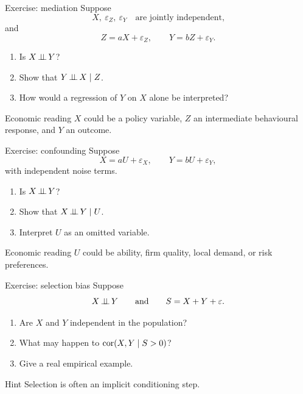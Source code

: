 \documentclass[dvipsnames,aspectratio=169,handout]{beamer}
\begin{document}
\begin{frame}{Exercise: mediation}
Suppose
\[
X,\ \varepsilon_Z,\ \varepsilon_Y
\quad\text{are jointly independent,}
\]
and
\[
Z=aX+\varepsilon_Z,
\qquad
Y=bZ+\varepsilon_Y.
\]

\begin{enumerate}
    \item Is $X\mbox{\,$\perp\!\!\!\perp$\,} Y$?
    \item Show that $Y\mbox{\,$\perp\!\!\!\perp$\,} X\mid Z$.
    \item How would a regression of $Y$ on $X$ alone be interpreted?
\end{enumerate}

\vspace{2mm}

\begin{block}{Economic reading}
$X$ could be a policy variable,
$Z$ an intermediate behavioural response,
and $Y$ an outcome.
\end{block}
\end{frame}


\begin{frame}{Exercise: confounding}
Suppose
\[
X=aU+\varepsilon_X,
\qquad
Y=bU+\varepsilon_Y,
\]
with independent noise terms.

\begin{enumerate}
    \item Is $X\mbox{\,$\perp\!\!\!\perp$\,} Y$?
    \item Show that $X\mbox{\,$\perp\!\!\!\perp$\,} Y\mid U$.
    \item Interpret $U$ as an omitted variable.
\end{enumerate}

\vspace{2mm}

\begin{block}{Economic reading}
$U$ could be ability, firm quality, local demand, or risk preferences.
\end{block}
\end{frame}

\begin{frame}{Exercise: selection bias}
Suppose
\[
X\mbox{\,$\perp\!\!\!\perp$\,} Y
\qquad\text{and}\qquad
S=X+Y+\varepsilon.
\]

\begin{enumerate}
    \item Are $X$ and $Y$ independent in the population?
    \item What may happen to $\operatorname{cor}(X,Y\mid S>0)$?
    \item Give a real empirical example.
\end{enumerate}

\vspace{2mm}

\begin{alertblock}{Hint}
Selection is often an implicit conditioning step.
\end{alertblock}
\end{frame}
\end{document}
